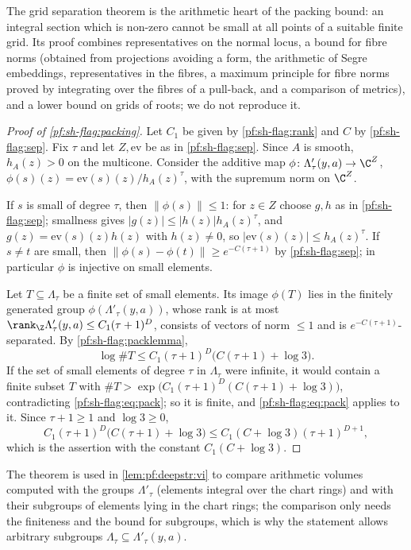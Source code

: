 The grid separation theorem is the arithmetic heart of the packing bound: an integral section which is non-zero cannot be small at all
points of a suitable finite grid. Its proof combines representatives on the normal locus, a bound for fibre norms (obtained from
projections avoiding a form, the arithmetic of Segre embeddings, representatives in the fibres, a maximum principle for fibre norms
proved by integrating over the fibres of a pull-back, and a comparison of metrics), and a lower bound on grids of roots; we do not reproduce
it.

\begin{proof}[Proof of \cref{pf:sh-flag:packing}]
Let $C_1$ be given by \cref{pf:sh-flag:rank} and $C$ by \cref{pf:sh-flag:sep}. Fix $\tau$ and let $Z,\mathrm{ev}$ be as in
\cref{pf:sh-flag:sep}. Since $A$ is smooth, $h_A(z)>0$ on the multicone. Consider the additive map
$\phi\colon\Lambda'_\tau(y,a)\to\C^Z$, $\phi(s)(z)=\mathrm{ev}(s)(z)/h_A(z)^\tau$, with the supremum norm on $\C^Z$.

If $s$ is small of degree $\tau$, then $\|\phi(s)\|\le1$: for $z\in Z$ choose $g,h$ as in \cref{pf:sh-flag:sep}; smallness gives
$|g(z)|\le|h(z)|h_A(z)^\tau$, and $g(z)=\mathrm{ev}(s)(z)h(z)$ with $h(z)\ne0$, so $|\mathrm{ev}(s)(z)|\le h_A(z)^\tau$. If $s\ne t$ are small, then
$\|\phi(s)-\phi(t)\|\ge e^{-C(\tau+1)}$ by \cref{pf:sh-flag:sep}; in particular $\phi$ is injective on small elements.

Let $T\subseteq\Lambda_\tau$ be a finite set of small elements. Its image $\phi(T)$ lies in the finitely generated group
$\phi(\Lambda'_\tau(y,a))$, whose rank is at most $\rank_\Z\Lambda'_\tau(y,a)\le C_1(\tau+1)^D$, consists of vectors of norm $\le1$ and is
$e^{-C(\tau+1)}$-separated. By \cref{pf:sh-flag:packlemma},
\begin{equation}\label{pf:sh-flag:eq:pack}
\log\#T\le C_1(\tau+1)^D\bigl(C(\tau+1)+\log3\bigr).
\end{equation}
If the set of small elements of degree $\tau$ in $\Lambda_\tau$ were infinite, it would contain a finite subset $T$ with
$\#T>\exp\bigl(C_1(\tau+1)^D(C(\tau+1)+\log3)\bigr)$, contradicting \eqref{pf:sh-flag:eq:pack}; so it is finite, and
\eqref{pf:sh-flag:eq:pack} applies to it. Since $\tau+1\ge1$ and $\log3\ge0$,
\[
C_1(\tau+1)^D\bigl(C(\tau+1)+\log3\bigr)\le C_1(C+\log3)(\tau+1)^{D+1},
\]
which is the assertion with the constant $C_1(C+\log3)$.
\end{proof}

\begin{remark}\label{pf:sh-flag:rem:packing}
The theorem is used in \cref{lem:pf:deepstr:vi} to compare arithmetic volumes computed with the groups $\Lambda'_\tau$ (elements integral
over the chart rings) and with their subgroups of elements lying in the chart rings; the comparison only needs the finiteness and the
bound for subgroups, which is why the statement allows arbitrary subgroups $\Lambda_\tau\subseteq\Lambda'_\tau(y,a)$.
\end{remark}
